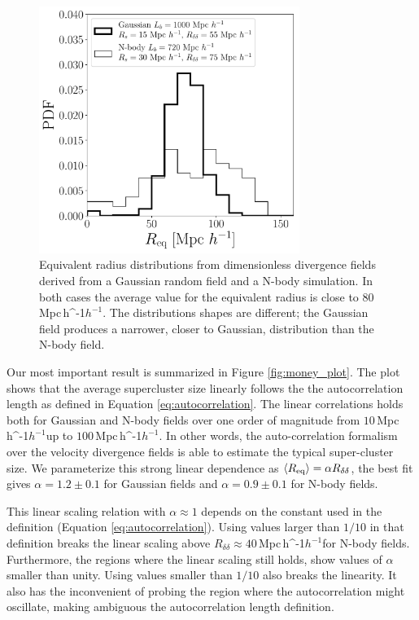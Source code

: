 \documentclass[usenatbib]{mnras}
\newcommand{\Mpch}{\,{\rm Mpc}\,\ifmmode h^{-1}\else $h^{-1}$\fi}
\begin{document}
 
\begin{figure}
    \centering
    \includegraphics[width=240pt]{sizes_histogram.pdf}
    \caption{Equivalent radius distributions from dimensionless divergence fields derived from a Gaussian random field and a N-body simulation.
    In both cases the average value for the equivalent radius is close to $80$\Mpch. 
    The distributions shapes are different; the Gaussian field produces a narrower, closer to Gaussian, distribution than the N-body field. }  
    \label{fig:Nclusters}
\end{figure}


Our most important result is summarized in Figure \ref{fig:money_plot}.
The plot shows that 
the average supercluster size linearly follows the the autocorrelation length as defined in Equation \ref{eq:autocorrelation}.
The linear correlations holds both for Gaussian and N-body fields over one order of magnitude from $10$\Mpch up to $100$\Mpch.
In other words, the auto-correlation formalism over the velocity divergence fields is able to estimate the typical super-cluster size.
We parameterize this strong linear dependence  as 
$\langle R_{\rm{eq}}\rangle=\alpha R_{\delta\delta}$, the best fit gives $\alpha=1.2\pm0.1$ for Gaussian fields and $\alpha=0.9\pm 0.1$ for N-body fields.

This linear scaling relation with $\alpha\approx 1$ depends on the constant used in the definition (Equation \ref{eq:autocorrelation}). 
Using values larger than $1/10$ in that definition breaks the linear scaling above $R_{\delta\delta}\approx 40$\Mpch for N-body fields. 
Furthermore, the regions where the linear scaling still holds, show values of $\alpha$ smaller than unity. 
Using values smaller than $1/10$ also breaks the linearity. 
It also has the inconvenient of probing the region where the autocorrelation might oscillate, making ambiguous the autocorrelation length definition.
    
\end{document}
